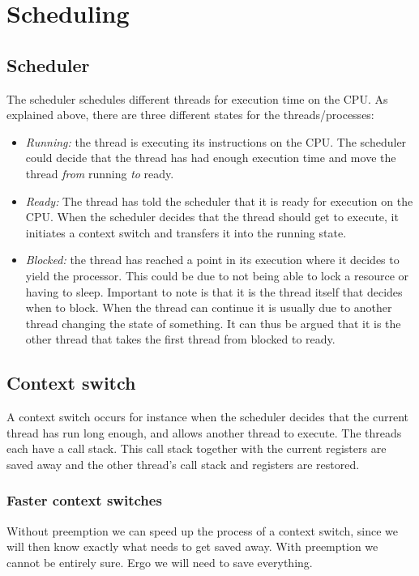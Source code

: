 \documentclass[a4paper]{article}
\begin{document}
\section{Scheduling}
\subsection{Scheduler}
The scheduler schedules different threads for execution time on the CPU. As
explained above, there are three different states for the threads/processes:

\begin{itemize}
  \item \emph{Running:} the thread is executing its instructions on the CPU.
        The scheduler could decide that the thread has had enough execution time
        and move the thread \emph{from} running \emph{to} ready.
  \item \emph{Ready:} The thread has told the scheduler that it is ready for
        execution on the CPU. When the scheduler decides that the thread should
        get to execute, it initiates a context switch and transfers it into
        the running state.
  \item \emph{Blocked:} the thread has reached a point in its execution where
        it decides to yield the processor. This could be due to not being able
        to lock a resource or having to sleep. Important to note is that it is
        the thread itself that decides when to block. When the thread can continue
        it is usually due to another thread changing the state of something.
        It can thus be argued that it is the other thread that takes the first
        thread from blocked to ready.
\end{itemize}

\subsection{Context switch}
A context switch occurs for instance when the scheduler decides that the
current thread has run long enough, and allows another thread to execute. The
threads each have a call stack. This call stack together with the current
registers are saved away and the other thread's call stack and registers are
restored.

\subsubsection{Faster context switches}
Without preemption we can speed up the process of a context switch, since
we will then know exactly what needs to get saved away. With preemption we
cannot be entirely sure. Ergo we will need to save everything.
\end{document}
